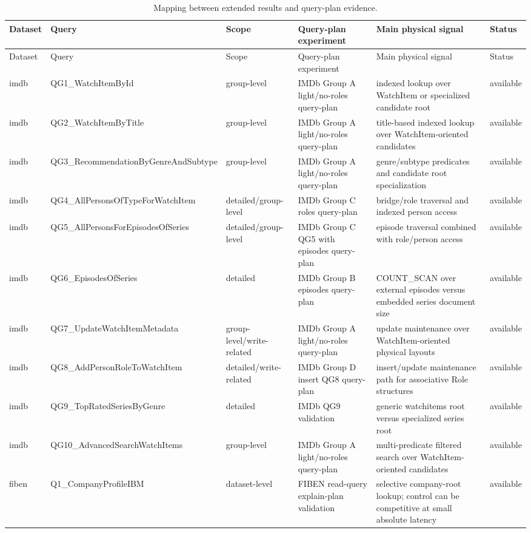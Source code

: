 \begin{longtable}{llllll}
\caption{Mapping between extended results and query-plan evidence.}\\
\toprule
Dataset & Query & Scope & Query-plan experiment & Main physical signal & Status \\
\midrule
\endfirsthead
\toprule
Dataset & Query & Scope & Query-plan experiment & Main physical signal & Status \\
\midrule
\endhead
imdb & QG1\_WatchItemById & group-level & IMDb Group A light/no-roles query-plan & indexed lookup over WatchItem or specialized candidate root & available \\
imdb & QG2\_WatchItemByTitle & group-level & IMDb Group A light/no-roles query-plan & title-based indexed lookup over WatchItem-oriented candidates & available \\
imdb & QG3\_RecommendationByGenreAndSubtype & group-level & IMDb Group A light/no-roles query-plan & genre/subtype predicates and candidate root specialization & available \\
imdb & QG4\_AllPersonsOfTypeForWatchItem & detailed/group-level & IMDb Group C roles query-plan & bridge/role traversal and indexed person access & available \\
imdb & QG5\_AllPersonsForEpisodesOfSeries & detailed/group-level & IMDb Group C QG5 with episodes query-plan & episode traversal combined with role/person access & available \\
imdb & QG6\_EpisodesOfSeries & detailed & IMDb Group B episodes query-plan & COUNT\_SCAN over external episodes versus embedded series document size & available \\
imdb & QG7\_UpdateWatchItemMetadata & group-level/write-related & IMDb Group A light/no-roles query-plan & update maintenance over WatchItem-oriented physical layouts & available \\
imdb & QG8\_AddPersonRoleToWatchItem & detailed/write-related & IMDb Group D insert QG8 query-plan & insert/update maintenance path for associative Role structures & available \\
imdb & QG9\_TopRatedSeriesByGenre & detailed & IMDb QG9 validation & generic watchitems root versus specialized series root & available \\
imdb & QG10\_AdvancedSearchWatchItems & group-level & IMDb Group A light/no-roles query-plan & multi-predicate filtered search over WatchItem-oriented candidates & available \\
fiben & Q1\_CompanyProfileIBM & dataset-level & FIBEN read-query explain-plan validation & selective company-root lookup; control can be competitive at small absolute latency & available \\

\end{longtable}
